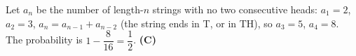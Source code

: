 Let $a_n$ be the number of length-$n$ strings with no two consecutive heads: $a_1=2$, $a_2=3$, $a_n=a_{n-1}+a_{n-2}$ (the string ends in T, or in TH), so $a_3=5$, $a_4=8$. The probability is $1-\dfrac8{16}=\dfrac12$. \textbf{(C)}
